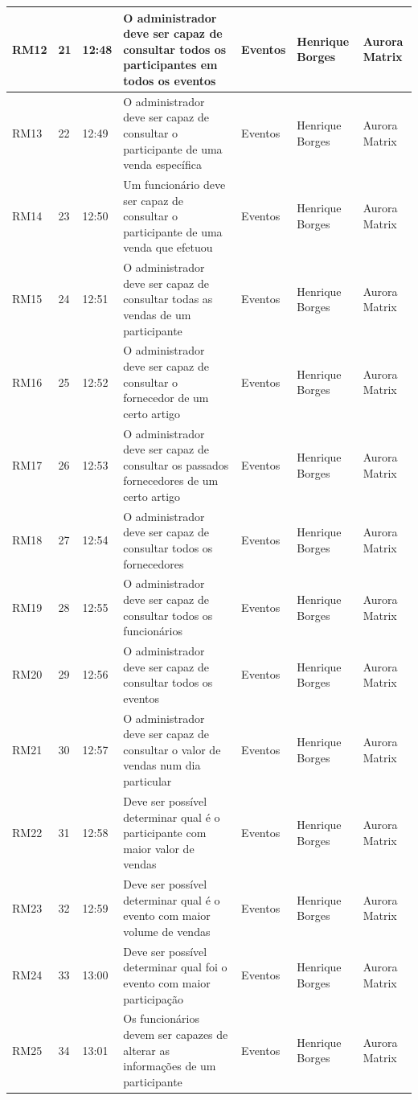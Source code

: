 \documentclass[a4paper,12pt]{scrreprt}
\begin{document}
\begin{table}[!ht]
{\begin{tabular}{|l|l|l|l|l|l|l|}
        RM12 & 21 & 12:48 & O administrador deve ser capaz de consultar todos os participantes em todos os eventos & Eventos & Henrique Borges & Aurora Matrix \\ \hline
        RM13 & 22 & 12:49 & O administrador deve ser capaz de consultar o participante de uma venda específica & Eventos & Henrique Borges & Aurora Matrix \\ \hline
        RM14 & 23 & 12:50 & Um funcionário deve ser capaz de consultar o participante de uma venda que efetuou & Eventos & Henrique Borges & Aurora Matrix \\ \hline
        RM15 & 24 & 12:51 & O administrador deve ser capaz de consultar todas as vendas de um participante & Eventos & Henrique Borges & Aurora Matrix \\ \hline
        RM16 & 25 & 12:52 & O administrador deve ser capaz de consultar o fornecedor de um certo artigo & Eventos & Henrique Borges & Aurora Matrix \\ \hline
        RM17 & 26 & 12:53 & O administrador deve ser capaz de consultar os passados fornecedores de um certo artigo & Eventos & Henrique Borges & Aurora Matrix \\ \hline
        RM18 & 27 & 12:54 & O administrador deve ser capaz de consultar todos os fornecedores & Eventos & Henrique Borges & Aurora Matrix \\ \hline
        RM19 & 28 & 12:55 & O administrador deve ser capaz de consultar todos os funcionários & Eventos & Henrique Borges & Aurora Matrix \\ \hline
        RM20 & 29 & 12:56 & O administrador deve ser capaz de consultar todos os eventos & Eventos & Henrique Borges & Aurora Matrix \\ \hline
        RM21 & 30 & 12:57 & O administrador deve ser capaz de consultar o valor de vendas num dia particular & Eventos & Henrique Borges & Aurora Matrix \\ \hline
        RM22 & 31 & 12:58 & Deve ser possível determinar qual é o participante com maior valor de vendas & Eventos & Henrique Borges & Aurora Matrix \\ \hline
        RM23 & 32 & 12:59 & Deve ser possível determinar qual é o evento com maior volume de vendas & Eventos & Henrique Borges & Aurora Matrix \\ \hline
        RM24 & 33 & 13:00 & Deve ser possível determinar qual foi o evento com maior participação & Eventos & Henrique Borges & Aurora Matrix \\ \hline
        RM25 & 34 & 13:01 & Os funcionários devem ser capazes de alterar as informações de um participante & Eventos & Henrique Borges & Aurora Matrix \\ \hline

\end{tabular}}
\end{table}
\end{document}
